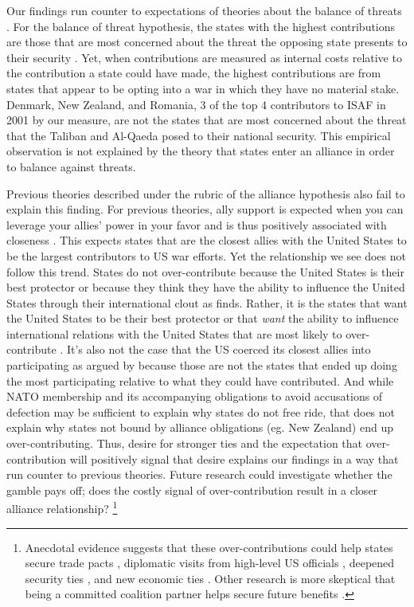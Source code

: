 \documentclass[12pt,letterpaper]{article}
\begin{document}
	Our findings run counter to expectations of theories about the balance of threats \citep{walt_originsalliance_1987}. For the balance of threat hypothesis, the states with the highest contributions are those that are most concerned about the threat the opposing state presents to their security \citep{haesebrouck_democraticparticipationair_2016}. Yet, when contributions are measured as internal costs relative to the contribution a state could have made, the highest contributions are from states that appear to be opting into a war in which they have no material stake. Denmark, New Zealand, and Romania, 3 of the top 4 contributors to ISAF in 2001 by our measure, are not the states that are most concerned about the threat that the Taliban and Al-Qaeda posed to their national security. This empirical observation is not explained by the theory that states enter an alliance in order to balance against threats.

	Previous theories described under the rubric of the alliance hypothesis also fail to explain this finding. For previous theories, ally support is expected when you can leverage your allies' power in your favor and is thus positively associated with closeness \citep{davidson_neoclassicalrealistexplanation_2011}. This expects states that are the closest allies with the United States to be the largest contributors to US war efforts. Yet the relationship we see does not follow this trend. States do not over-contribute because the United States is their best protector or because they think they have the ability to influence the United States through their international clout as \citet{ringsmose_natoburdensharingredux_2010} finds. Rather, it is the states that want the United States to be their best protector or that \textit{want} the ability to influence international relations with the United States that are most likely to over-contribute \citep{vonhlatky_greatasymmetryamerica_2010}. It's also not the case that the US coerced its closest allies into participating as argued by \citet{kupchan_natopersiangulf_1988} because those are not the states that ended up doing the most participating relative to what they could have contributed. And while NATO membership and its accompanying obligations to avoid accusations of defection may be sufficient to explain why states do not free ride, that does not explain why states not bound by alliance obligations (eg. New Zealand) end up over-contributing. Thus, desire for stronger ties and the expectation that over-contribution will positively signal that desire explains our findings in a way that run counter to previous theories. Future research could investigate whether the gamble pays off; does the costly signal of over-contribution result in a closer alliance relationship? \footnote{Anecdotal evidence suggests that these over-contributions could help states secure trade pacts \citep{armstrong_alliesrewardedtrade_2003}, diplomatic visits from high-level US officials \citep{sanger_meanwhilebackranch_2003}, deepened security ties \citep{whatalliesare_2003}, and new economic ties \citep{whitmore_uswarallies_2003}. Other research is more skeptical that being a committed coalition partner helps secure future benefits \citep{porter_lastchargeknights_2010}.}
\end{document}

